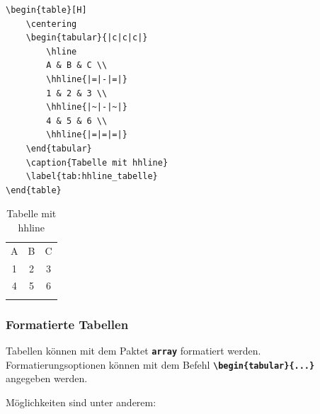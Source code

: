 \begin{minipage}{0.5\textwidth}
    \begin{lstlisting}[language={[LaTeX]TeX}]
\begin{table}[H]
    \centering
    \begin{tabular}{|c|c|c|}
        \hline
        A & B & C \\
        \hhline{|=|-|=|} 
        1 & 2 & 3 \\
        \hhline{|~|-|~|} 
        4 & 5 & 6 \\
        \hhline{|=|=|=|} 
    \end{tabular}
    \caption{Tabelle mit hhline}
    \label{tab:hhline_tabelle}
\end{table}
\end{lstlisting}
\end{minipage}
\hfill
\begin{minipage}{0.5\textwidth}
    \begin{table}[H]
        \centering
        \begin{tabular}{|c|c|c|}
            \hline
            A & B & C \\
            \hhline{|=|-|=|}
            1 & 2 & 3 \\
            \hhline{|~|-|~|}
            4 & 5 & 6 \\
            \hhline{|=|=|=|}
        \end{tabular}
        \caption{Tabelle mit hhline}
        \label{tab:hhline_tabelle}
    \end{table}
\end{minipage}

\subsubsection{Formatierte Tabellen}
Tabellen können mit dem Paktet \textbf{\texttt{array}} formatiert werden.
Formatierungsoptionen können mit dem Befehl \textbf{\texttt{\textbackslash begin\{tabular\}\{...\}}} angegeben werden.

Möglichkeiten sind unter anderem:

